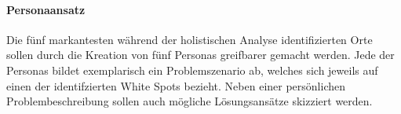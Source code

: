 \paragraph*{Personaansatz}
\label{personaansatz}

Die fünf markantesten während der holistischen Analyse identifizierten Orte sollen durch die Kreation von fünf Personas greifbarer gemacht werden. Jede der Personas bildet exemplarisch ein Problemszenario ab, welches sich jeweils auf einen der identifzierten White Spots bezieht. Neben einer persönlichen Problembeschreibung sollen auch mögliche Lösungsansätze skizziert werden.
